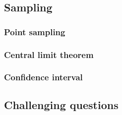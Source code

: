 \documentclass[12pt]{article}
\begin{document}
    \subsection{Sampling}

    \subsubsection*{Point sampling}

    \subsubsection*{Central limit theorem}

    \subsubsection*{Confidence interval}

    \subsection{Challenging questions}
\end{document}
